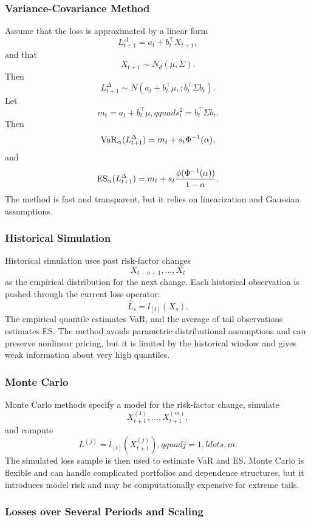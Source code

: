 \subsubsection{Variance-Covariance Method}

Assume that the loss is approximated by a linear form
\[
    L_{t+1}^{\Delta}=a_t+b_t^\top X_{t+1},
\]
and that
\[
    X_{t+1}\sim N_d(\mu,\Sigma).
\]
Then
\[
    L_{t+1}^{\Delta}\sim
    N(a_t+b_t^\top\mu,; b_t^\top\Sigma b_t).
\]
Let
\[
    m_t=a_t+b_t^\top\mu,qquad
    s_t^2=b_t^\top\Sigma b_t.
\]
Then
\[
    \operatorname{VaR}_\alpha(L_{t+1}^{\Delta})
    =m_t+s_t\Phi^{-1}(\alpha),
\]
and
\[
    \operatorname{ES}_\alpha(L_{t+1}^{\Delta})
    =m_t+s_t\frac{\phi(\Phi^{-1}(\alpha))}{1-\alpha}.
\]
The method is fast and transparent, but it relies on linearization and Gaussian assumptions.

\subsubsection{Historical Simulation}

Historical simulation uses past risk-factor changes
\[
    X_{t-n+1},\ldots,X_t
\]
as the empirical distribution for the next change. Each historical observation is pushed through the current loss operator:
\[
    \hat L_s=l_{[t]}(X_s).
\]
The empirical quantile estimates VaR, and the average of tail observations estimates ES. The method avoids parametric distributional assumptions and can preserve nonlinear pricing, but it is limited by the historical window and gives weak information about very high quantiles.

\subsubsection{Monte Carlo}

Monte Carlo methods specify a model for the risk-factor change, simulate
\[
    X_{t+1}^{(1)},\ldots,X_{t+1}^{(m)},
\]
and compute
\[
    L^{(j)}=l_{[t]}(X_{t+1}^{(j)}),qquad j=1,ldots,m.
\]
The simulated loss sample is then used to estimate VaR and ES. Monte Carlo is flexible and can handle complicated portfolios and dependence structures, but it introduces model risk and may be computationally expensive for extreme tails.

\subsubsection{Losses over Several Periods and Scaling}

